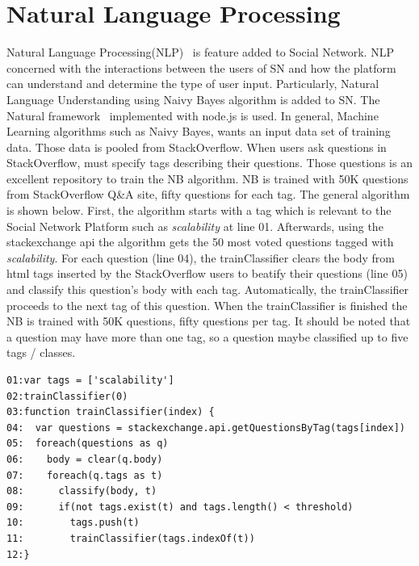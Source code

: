 \section{Natural Language Processing}
Natural Language Processing(NLP)~\cite{manning1999foundations} is feature added to Social Network. NLP concerned with the interactions between the users of SN and how the platform can understand and determine the type of user input. Particularly, Natural Language Understanding using Naivy Bayes algorithm is added to SN. The Natural framework~\cite{nodenatural_url} implemented with node.js is used. In general, Machine Learning algorithms such as Naivy Bayes, wants an input data set of training data. Those data is pooled from StackOverflow. When users ask questions in StackOverflow, must specify tags describing their questions. Those questions is an excellent repository to train the NB algorithm. NB is trained with 50K questions from StackOverflow Q\&A site, fifty questions for each tag. The general algorithm is shown below. First, the algorithm starts with a tag which is relevant to the Social Network Platform such as \emph{scalability} at line 01. Afterwards, using the stackexchange api the algorithm gets the 50 most voted questions tagged with \emph{scalability}. For each question (line 04), the trainClassifier clears the body from html tags inserted by the StackOverflow users to beatify their questions (line 05) and classify this question's body with each tag. Automatically, the trainClassifier proceeds to the next tag of this question. When the trainClassifier is finished the NB is trained with 50K questions, fifty questions per tag. It should be noted that a question may have more than one tag, so a question maybe classified up to five tags / classes.

\begin{lstlisting} 
01:var tags = ['scalability']
02:trainClassifier(0)
03:function trainClassifier(index) {
04:  var questions = stackexchange.api.getQuestionsByTag(tags[index])
05:  foreach(questions as q)
06:    body = clear(q.body)
07:    foreach(q.tags as t)
08:    	 classify(body, t)
09:    	 if(not tags.exist(t) and tags.length() < threshold)
10:    	   tags.push(t)	  
11:        trainClassifier(tags.indexOf(t))
12:}		
\end{lstlisting}